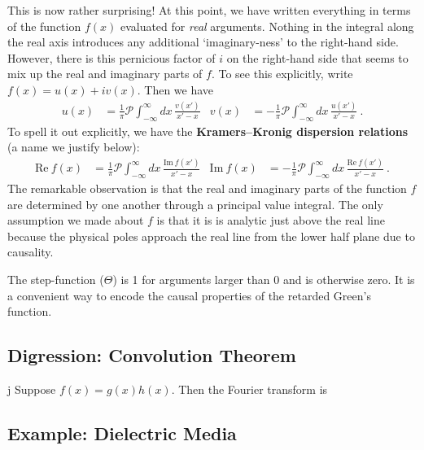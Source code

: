 This is now rather surprising! At this point, we have written everything in terms of the function $f(x)$ evaluated for \emph{real} arguments. Nothing in the integral along the real axis introduces any additional `imaginary-ness' to the right-hand side. However, there is this pernicious factor of $i$ on the right-hand side that seems to mix up the real and imaginary parts of $f$. To see this explicitly, write $f(x) = u(x) + i v(x)$. Then we have
\begin{align}
	u(x) &= \frac{1}{\pi}
	\mathcal P \int_{-\infty}^\infty dx 
		\, \frac{v(x')}{x'-x} 
		&
	v(x) &= -\frac{1}{\pi}
	\mathcal P \int_{-\infty}^\infty dx 
		\, \frac{u(x')}{x'-x} 
	\ .
\end{align}
To spell it out explicitly, we have the \textbf{Kramers--Kronig dispersion relations} (a name we justify below):
\begin{align}
	\text{Re}~f(x) &= \frac{1}{\pi}
	\mathcal P \int_{-\infty}^\infty dx 
		\, \frac{\text{Im}~f(x')}{x'-x} 
		&
	\text{Im}~f(x) &= -\frac{1}{\pi}
	\mathcal P \int_{-\infty}^\infty dx 
		\, \frac{\text{Re}~f(x')}{x'-x} 
	\ .
\end{align}
The remarkable observation is that the real and imaginary parts of the function $f$ are determined by one another through a principal value integral. The only assumption we made about $f$ is that it is is analytic just above the real line because the physical poles approach the real line from the lower half plane due to causality.

\begin{example}
The step-function ($\Theta$) is 1 for arguments larger than 0 and is otherwise zero. It is a convenient way to encode the causal properties of the retarded Green's function. 
\end{example}

\subsection{Digression: Convolution Theorem}


j
Suppose $f(x) = g(x)h(x)$. Then the Fourier transform is
\subsection{Example: Dielectric Media}







